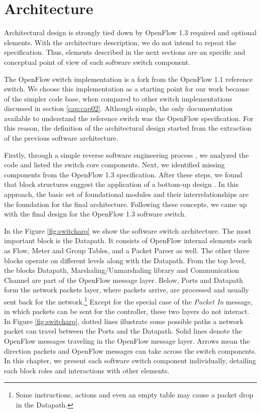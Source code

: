 \chapter{Architecture}
\label{cap:cap03}

Architectural design is strongly tied down by OpenFlow 1.3 required and optional elements. With the architecture description, we do not intend to repeat the specification. Thus, elements described in the next sections are an specific and conceptual point of view of each software switch component. 

The OpenFlow switch implementation is a fork from the OpenFlow 1.1 reference switch. We choose this implementation as a starting point for our work because of the simpler code base, when compared to other switch implementations discussed in section \ref{cap:cap02}. Although simple, the only documentation available to understand the reference switch was the OpenFlow specification. For this reason, the definition of the architectural design started from the extraction of the previous software architecture. 

Firstly, through a simple reverse software engineering process \cite{Sommerville:2001:SE:375369}, we analyzed the code and listed the switch core components. Next, we identified missing components from the OpenFlow 1.3 specification. After these steps, we found that block structures suggest the application of a bottom-up design \cite{vonMayrhauser:1990:SEM:79005}. In this approach, the basic set of foundational modules and their interrelationships are the foundation for the final architecture. Following these concepts, we came up with the final design for the OpenFlow 1.3 software switch.

In the Figure \ref{fig:switcharq} we show the software switch architecture. The most important block is the Datapath. It consists of OpenFlow internal elements such as Flow, Meter and Group Tables, and a Packet Parser as well. The other three blocks operate on different levels along with the Datapath. From the top level, the blocks Datapath, Marshaling/Unmarshaling library and Communication Channel are part of the OpenFlow message layer. Below, Ports and Datapath form the network packets layer, where packets arrive, are processed and usually sent back for the network.\footnote{Some instructions, actions and even an empty table may cause a packet drop in the Datapath.} Except for the special case of the \textit{Packet In} message, in which packets can be sent for the controller, these two layers do not interact. In Figure \ref{fig:switcharq}, dotted lines illustrate some possible paths a network packet can travel between the Ports and the Datapath. Solid lines denote the OpenFlow messages traveling in the OpenFlow message layer. Arrows mean the direction packets and OpenFlow messages can take across the switch components. In this chapter, we present each software switch component individually, detailing each block roles and interactions with other elements.

